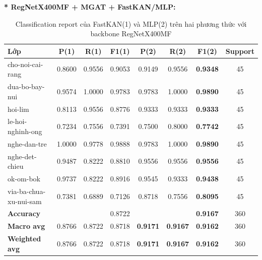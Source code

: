 \newpage
\textbf{* RegNetX400MF + MGAT + FastKAN/MLP:}
\begin{table}[H]
\centering
\renewcommand{\arraystretch}{1.08}
\caption{\centering Classification report của FastKAN(1) và MLP(2) trên hai phương thức với backbone RegNetX400MF}
\begin{tabular}{lccccccc}
\hline \textbf{Lớp} & \textbf{P(1)} & \textbf{R(1)} & \textbf{F1(1)} & \textbf{P(2)} & \textbf{R(2)} & \textbf{F1(2)} & \textbf{Support} \\ \hline

cho-noi-cai-rang
& 0.8600 & 0.9556 & 0.9053 
& 0.9149 & 0.9556 & \textbf{0.9348} & 45 \\

dua-bo-bay-nui 
& 0.9574 & 1.0000 & 0.9783 
& 0.9783 & 1.0000 & \textbf{0.9890} & 45 \\

hoi-lim 
& 0.8113 & 0.9556 & 0.8776 
& 0.9333 & 0.9333 & \textbf{0.9333} & 45 \\

le-hoi-nghinh-ong
& 0.7234 & 0.7556 & 0.7391 
& 0.7500 & 0.8000 & \textbf{0.7742} & 45 \\

nghe-dan-tre
& 1.0000 & 0.9778 & 0.9888 
& 0.9783 & 1.0000 & \textbf{0.9890} & 45 \\

nghe-det-chieu 
& 0.9487 & 0.8222 & 0.8810 
& 0.9556 & 0.9556 & \textbf{0.9556} & 45 \\

ok-om-bok 
& 0.9737 & 0.8222 & 0.8916 
& 0.9545 & 0.9333 & \textbf{0.9438} & 45 \\

via-ba-chua-xu-nui-sam 
& 0.7381 & 0.6889 & 0.7126 
& 0.8718 & 0.7556 & \textbf{0.8095} & 45 \\
\hline

\textbf{Accuracy}
& & & 0.8722
& & & \textbf{0.9167}  & 360 \\

\textbf{Macro avg} 
& 0.8766 & 0.8722 & 0.8718 
& \textbf{0.9171} & \textbf{0.9167} & \textbf{0.9162} & 360 \\

\textbf{Weighted avg}
& 0.8766 & 0.8722 & 0.8718 
& \textbf{0.9171} & \textbf{0.9167} & \textbf{0.9162} & 360 \\
\hline
\end{tabular}
\end{table}
